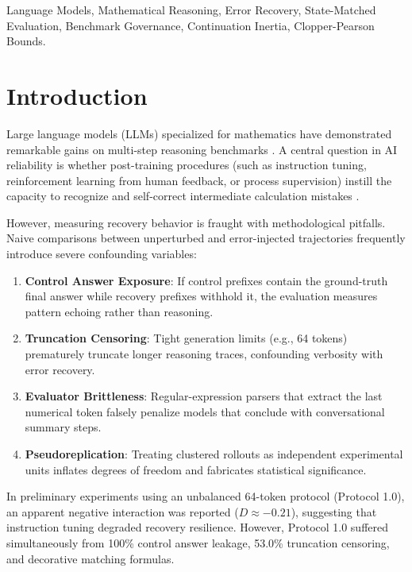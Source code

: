 \documentclass[10pt,conference]{IEEEtran}
\begin{document}
\begin{IEEEkeywords}
Language Models, Mathematical Reasoning, Error Recovery, State-Matched Evaluation, Benchmark Governance, Continuation Inertia, Clopper-Pearson Bounds.
\end{IEEEkeywords}

\section{Introduction}
Large language models (LLMs) specialized for mathematics have demonstrated remarkable gains on multi-step reasoning benchmarks \cite{cobbe2021gsm8k, qwen25math2024}. A central question in AI reliability is whether post-training procedures (such as instruction tuning, reinforcement learning from human feedback, or process supervision) instill the capacity to recognize and self-correct intermediate calculation mistakes \cite{lightman2023process, zelikman2022star}. 

However, measuring recovery behavior is fraught with methodological pitfalls. Naive comparisons between unperturbed and error-injected trajectories frequently introduce severe confounding variables:
\begin{enumerate}
    \item \textbf{Control Answer Exposure}: If control prefixes contain the ground-truth final answer while recovery prefixes withhold it, the evaluation measures pattern echoing rather than reasoning.
    \item \textbf{Truncation Censoring}: Tight generation limits (e.g., 64 tokens) prematurely truncate longer reasoning traces, confounding verbosity with error recovery.
    \item \textbf{Evaluator Brittleness}: Regular-expression parsers that extract the last numerical token falsely penalize models that conclude with conversational summary steps.
    \item \textbf{Pseudoreplication}: Treating clustered rollouts as independent experimental units inflates degrees of freedom and fabricates statistical significance.
\end{enumerate}

In preliminary experiments using an unbalanced 64-token protocol (Protocol 1.0), an apparent negative interaction was reported ($D \approx -0.21$), suggesting that instruction tuning degraded recovery resilience. However, Protocol 1.0 suffered simultaneously from 100\% control answer leakage, 53.0\% truncation censoring, and decorative matching formulas.
\end{document}
